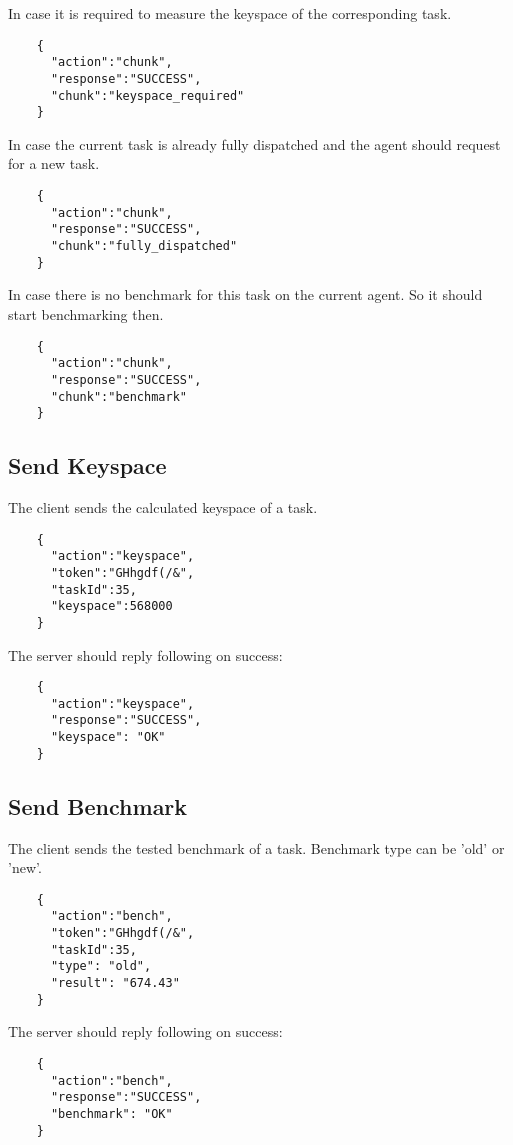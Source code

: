 \documentclass{article}
\begin{document}
	In case it is required to measure the keyspace of the corresponding task.
	\begin{verbatim}
	{
	  "action":"chunk",
	  "response":"SUCCESS",
	  "chunk":"keyspace_required"
	}
	\end{verbatim}
	
	In case the current task is already fully dispatched and the agent should request for a new task.
	\begin{verbatim}
	{
	  "action":"chunk",
	  "response":"SUCCESS",
	  "chunk":"fully_dispatched"
	}
	\end{verbatim}
	
	In case there is no benchmark for this task on the current agent. So it should start benchmarking then.
	\begin{verbatim}
	{
	  "action":"chunk",
	  "response":"SUCCESS",
	  "chunk":"benchmark"
	}
	\end{verbatim}
	
	
	\subsection*{Send Keyspace}
	The client sends the calculated keyspace of a task.
	\begin{verbatim}
	{
	  "action":"keyspace",
	  "token":"GHhgdf(/&",
	  "taskId":35,
	  "keyspace":568000
	}
	\end{verbatim}
	The server should reply following on success:
	\begin{verbatim}
	{
	  "action":"keyspace",
	  "response":"SUCCESS",
	  "keyspace": "OK"
	}
	\end{verbatim}
	
	\subsection*{Send Benchmark}
	The client sends the tested benchmark of a task. Benchmark type can be 'old' or 'new'.
	\begin{verbatim}
	{
	  "action":"bench",
	  "token":"GHhgdf(/&",
	  "taskId":35,
	  "type": "old",
	  "result": "674.43"
	}
	\end{verbatim}
	The server should reply following on success:
	\begin{verbatim}
	{
	  "action":"bench",
	  "response":"SUCCESS",
	  "benchmark": "OK"
	}
	\end{verbatim}
	
	
\end{document}
